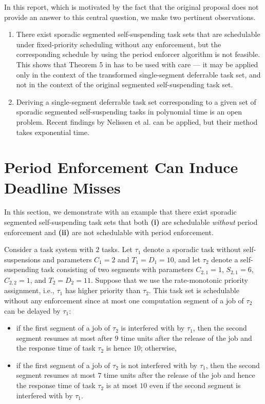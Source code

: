 In this report, which is motivated by the fact that the original proposal \cite{Raj:suspension1991} does not provide an answer to this central question, 
we make two pertinent observations.
\begin{enumerate}
	\item There exist sporadic segmented self-suspending task sets that are schedulable under fixed-priority scheduling without any enforcement, but the corresponding schedule by using the period enforcer algorithm is not feasible. This shows that Theorem 5 in \cite{Raj:suspension1991} has to be  used with care --- it may be applied only in the context of the transformed single-segment deferrable task set, and not in the context of the original segmented self-suspending task set.

	\item Deriving a single-segment deferrable task set corresponding to a given set of sporadic segmented self-suspending tasks in polynomial time is an open problem. Recent findings by Nelissen et al. \cite{ecrts15nelissen} can be applied, but their method takes exponential time.
\end{enumerate}

\section{Period Enforcement Can Induce Deadline Misses}
\label{sec:unschedulable}

In this section, we demonstrate with an example that there exist sporadic  segmented self-suspending task sets that both \textbf{(i)} are schedulable \emph{without} period enforcement and \textbf{(ii)} are not schedulable with period enforcement.

Consider a task system with $2$ tasks. Let $\tau_1$ denote a sporadic task without self-suspensions and parameters $C_1 = 2$ and $T_1=D_1=10$, and let $\tau_2$ denote a self-suspending task consisting of two segments with parameters  $C_{2,1} = 1$,  $S_{2,1} = 6$, $C_{2,2}=1$, and $ T_2=D_2=11$. Suppose that we use the rate-monotonic priority assignment, i.e., $\tau_1$ has higher priority than $\tau_2$. This task set is schedulable without any enforcement since at most one computation segment of a job of $\tau_2$ can be delayed by $\tau_1$: 
\begin{itemize}
	\item if the first segment of a job of $\tau_2$ is interfered with by $\tau_1$, then the second segment resumes at most after $9$ time units after the release of the job and the response time of task $\tau_2$ is hence $10$; otherwise,
	\item  if the first segment of a job of $\tau_2$ is not interfered with by $\tau_1$, then the second segment resumes at most $7$ time units after the release of the job and hence the  response time of task $\tau_2$ is at most $10$ even if the second segment is interfered with by $\tau_1$.
\end{itemize}


